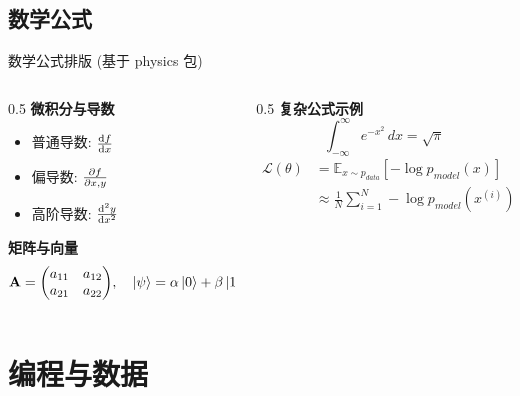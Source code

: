 \subsection{数学公式}
\begin{frame}{数学公式排版 (基于 physics 包)}
  \begin{columns}[c]
    \begin{column}{0.5\textwidth}
      \textbf{微积分与导数}
      \begin{itemize}
        \item 普通导数: $\dv{f}{x}$
        \item 偏导数: $\pdv{f}{x,y}$
        \item 高阶导数: $\dv[2]{y}{x}$
      \end{itemize}
      \vspace{1em}
      \textbf{矩阵与向量}
      \[
        \mathbf{A} = \mqty(
          a_{11} & a_{12} \\
          a_{21} & a_{22}
        ), \quad
        \ket{\psi} = \alpha \ket{0} + \beta \ket{1}
      \]
    \end{column}
    \begin{column}{0.5\textwidth}
      \textbf{复杂公式示例}
      \begin{equation}
        \int_{-\infty}^{\infty} e^{-x^2} \, dx = \sqrt{\pi}
      \end{equation}
      \begin{equation}
        \begin{aligned}
          \mathcal{L}(\theta) &= \mathbb{E}_{x \sim p_{data}} [-\log
          p_{model}(x)] \\
          &\approx \frac{1}{N} \sum_{i=1}^N -\log p_{model}(x^{(i)})
        \end{aligned}
      \end{equation}
    \end{column}
  \end{columns}
\end{frame}

\section{编程与数据}

